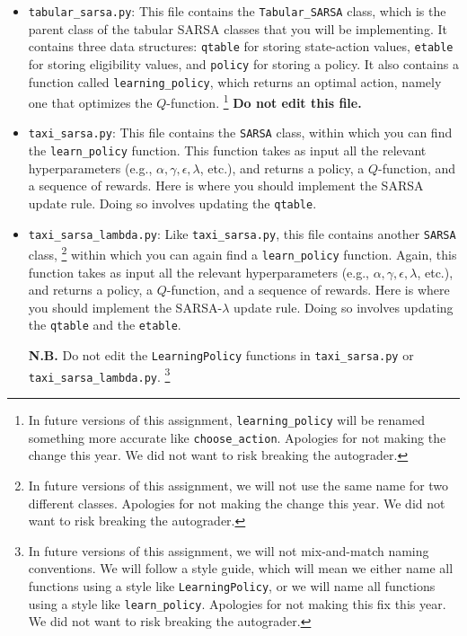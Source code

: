 \documentclass{article}
\begin{document}
\begin{itemize}
\item \texttt{tabular\_sarsa.py}:
  This file contains the \texttt{Tabular\_SARSA} class,
  which is the parent class of the tabular SARSA classes that you will be implementing.
  It contains three data structures:
  \texttt{qtable} for storing state-action values,
  \texttt{etable} for storing eligibility values,
  and \texttt{policy} for storing a policy.
  It also contains a function called \texttt{learning\_policy}, which returns an optimal action,
  namely one that optimizes the $Q$-function.%
\footnote{In future versions of this assignment,
  \texttt{learning\_policy} will be renamed something more accurate like \texttt{choose\_action}.
Apologies for not making the change this year.  We did not want to risk breaking the autograder.}  
  \textbf{Do not edit this file.}

\item \texttt{taxi\_sarsa.py}:
  This file contains the \texttt{SARSA} class,
  within which you can find the \texttt{learn\_policy} function.
  This function takes as input all the relevant hyperparameters
  (e.g., $\alpha, \gamma, \epsilon, \lambda$, etc.),
  and returns a policy, a $Q$-function, and a sequence of rewards.
  Here is where you should implement the SARSA update rule.
  Doing so involves updating the \texttt{qtable}.

\item \texttt{taxi\_sarsa\_lambda.py}:
  Like \texttt{taxi\_sarsa.py}, this file contains another \texttt{SARSA} class,%
\footnote{In future versions of this assignment, we will not use the same name for two different classes.
Apologies for not making the change this year.  We did not want to risk breaking the autograder.}  
  within which you can again find a \texttt{learn\_policy} function.
  Again, this function takes as input all the relevant hyperparameters
  (e.g., $\alpha, \gamma, \epsilon, \lambda$, etc.),
  and returns a policy, a $Q$-function, and a sequence of rewards.
  Here is where you should implement the SARSA-$\lambda$ update rule.
  Doing so involves updating the \texttt{qtable} and the \texttt{etable}.
  
  \textbf{N.B.} Do not edit the \texttt{LearningPolicy} functions in
  \texttt{taxi\_sarsa.py} or \texttt{taxi\_sarsa\_lambda.py}.
\footnote{In future versions of this assignment, we will not mix-and-match naming conventions.
We will follow a style guide, which will mean we either name all functions using a style like
\texttt{LearningPolicy}, or we will name all functions using a style like \texttt{learn\_policy}.
Apologies for not making this fix this year.  We did not want to risk breaking the autograder.}  
\end{itemize}
\end{document}
